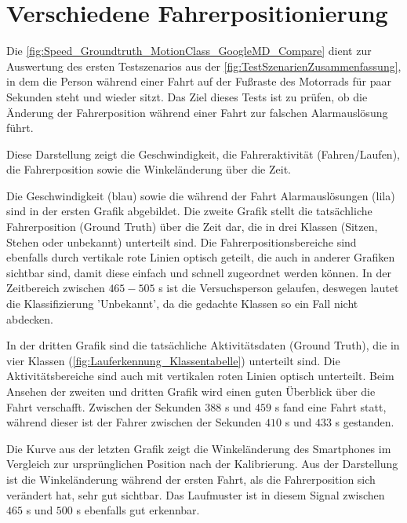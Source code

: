 \section{Verschiedene Fahrerpositionierung}
Die \autoref{fig:Speed_Groundtruth_MotionClass_GoogleMD_Compare} dient zur Auswertung des ersten Testszenarios aus der \autoref{fig:TestSzenarienZusammenfassung}, in dem die Person während einer Fahrt auf der Fußraste des Motorrads für paar Sekunden steht und wieder sitzt. Das Ziel dieses Tests ist zu prüfen, ob die Änderung der Fahrerposition während einer Fahrt zur falschen Alarmauslösung führt.

Diese Darstellung zeigt die Geschwindigkeit, die Fahreraktivität (Fahren/Laufen), die Fahrerposition sowie die Winkeländerung über die Zeit.

Die Geschwindigkeit (blau) sowie die während der Fahrt Alarmauslösungen (lila) sind in der ersten Grafik abgebildet.
Die zweite Grafik stellt die tatsächliche Fahrerposition (Ground Truth) über die Zeit dar, die in drei Klassen (Sitzen, Stehen oder unbekannt) unterteilt sind.
Die Fahrerpositionsbereiche sind ebenfalls durch vertikale rote Linien optisch geteilt, die auch in anderer Grafiken sichtbar sind, damit diese einfach und schnell zugeordnet werden können.
In der Zeitbereich zwischen $465 - 505$ s ist die Versuchsperson gelaufen, deswegen lautet die Klassifizierung 'Unbekannt', da die gedachte Klassen so ein Fall nicht abdecken.

In der dritten Grafik sind die tatsächliche Aktivitätsdaten (Ground Truth), die in vier Klassen (\autoref{fig:Lauferkennung_Klassentabelle}) unterteilt sind. Die Aktivitätsbereiche sind auch mit vertikalen roten Linien optisch unterteilt. Beim Ansehen der zweiten und dritten Grafik wird einen guten Überblick über die Fahrt verschafft. Zwischen der Sekunden $388$ s und $459$ s fand eine Fahrt statt, während dieser ist der Fahrer zwischen der Sekunden $410$ s und $433$ s gestanden.

Die Kurve aus der letzten Grafik zeigt die Winkeländerung des Smartphones im Vergleich zur ursprünglichen Position nach der Kalibrierung. Aus der Darstellung ist die Winkeländerung während der ersten Fahrt, als die Fahrerposition sich verändert hat, sehr gut sichtbar. Das Laufmuster ist in diesem Signal zwischen $465$ s und $500$ s ebenfalls gut erkennbar.

